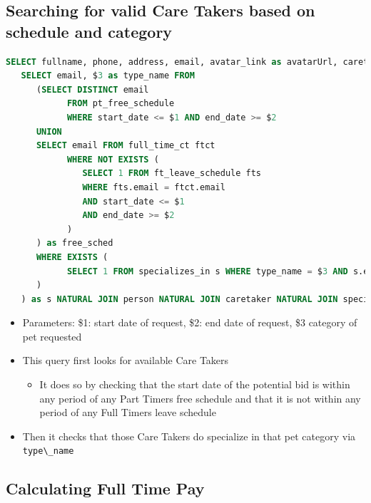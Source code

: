 \documentclass[
  paper=a4,
  ,captions=tableheading
]{scrartcl}
\newcommand{\passthrough}[1]{#1}
\providecommand{\tightlist}{%
  \setlength{\itemsep}{0pt}\setlength{\parskip}{0pt}}
\begin{document}
\hypertarget{searching-for-valid-care-takers-based-on-schedule-and-category}{%
\subsection{Searching for valid Care Takers based on schedule and
category}\label{searching-for-valid-care-takers-based-on-schedule-and-category}}

\begin{lstlisting}[language=SQL]
SELECT fullname, phone, address, email, avatar_link as avatarUrl, caretaker_status as caretakerStatus, rating, ct_price_daily as ctPriceDaily, type_name as typeName FROM (
   SELECT email, $3 as type_name FROM
      (SELECT DISTINCT email
            FROM pt_free_schedule
            WHERE start_date <= $1 AND end_date >= $2
      UNION
      SELECT email FROM full_time_ct ftct
            WHERE NOT EXISTS (
               SELECT 1 FROM ft_leave_schedule fts
               WHERE fts.email = ftct.email
               AND start_date <= $1
               AND end_date >= $2
            )
      ) as free_sched
      WHERE EXISTS (
            SELECT 1 FROM specializes_in s WHERE type_name = $3 AND s.email=free_sched.email
      )
   ) as s NATURAL JOIN person NATURAL JOIN caretaker NATURAL JOIN specializes_in
\end{lstlisting}

\begin{itemize}
\tightlist
\item
  Parameters: \$1: start date of request, \$2: end date of request, \$3
  category of pet requested
\item
  This query first looks for available Care Takers

  \begin{itemize}
  \tightlist
  \item
    It does so by checking that the start date of the potential bid is
    within any period of any Part Timers free schedule and that it is
    not within any period of any Full Timers leave schedule
  \end{itemize}
\item
  Then it checks that those Care Takers do specialize in that pet
  category via \passthrough{\lstinline!type\_name!}
\end{itemize}

\hypertarget{calculating-full-time-pay}{%
\subsection{Calculating Full Time Pay}\label{calculating-full-time-pay}}
\end{document}
